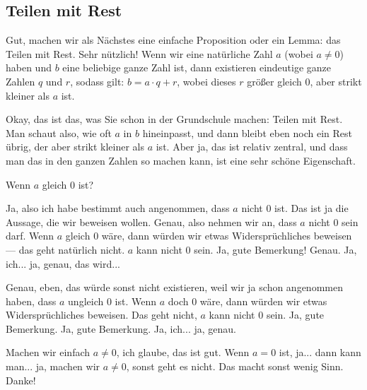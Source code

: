 \subsection{Teilen mit Rest}

\begin{spoken-clean}[00:07:09 - 00:12:02]
Gut, machen wir als Nächstes eine einfache Proposition oder ein Lemma: das Teilen mit Rest. Sehr nützlich! Wenn wir eine natürliche Zahl $a$ (wobei $a \neq 0$) haben und $b$ eine beliebige ganze Zahl ist, dann existieren eindeutige ganze Zahlen $q$ und $r$, sodass gilt: $b = a \cdot q + r$, wobei dieses $r$ größer gleich $0$, aber strikt kleiner als $a$ ist.

Okay, das ist das, was Sie schon in der Grundschule machen: Teilen mit Rest. Man schaut also, wie oft $a$ in $b$ hineinpasst, und dann bleibt eben noch ein Rest übrig, der aber strikt kleiner als $a$ ist. Aber ja, das ist relativ zentral, und dass man das in den ganzen Zahlen so machen kann, ist eine sehr schöne Eigenschaft.
\end{spoken-clean}

\begin{math-stroke}
\end{math-stroke}

\begin{student-interaction}[Studentenfrage]
Wenn $a$ gleich $0$ ist?
\end{student-interaction}

\begin{spoken-clean}[00:12:02 - 00:13:37]
Ja, also ich habe bestimmt auch angenommen, dass $a$ nicht $0$ ist. Das ist ja die Aussage, die wir beweisen wollen. Genau, also nehmen wir an, dass $a$ nicht $0$ sein darf. Wenn $a$ gleich $0$ wäre, dann würden wir etwas Widersprüchliches beweisen --- das geht natürlich nicht. $a$ kann nicht $0$ sein. Ja, gute Bemerkung! Genau. Ja, ich... ja, genau, das wird...

Genau, eben, das würde sonst nicht existieren, weil wir ja schon angenommen haben, dass $a$ ungleich $0$ ist. Wenn $a$ doch $0$ wäre, dann würden wir etwas Widersprüchliches beweisen. Das geht nicht, $a$ kann nicht $0$ sein. Ja, gute Bemerkung. Ja, gute Bemerkung. Ja, ich... ja, genau.

Machen wir einfach $a \neq 0$, ich glaube, das ist gut. Wenn $a = 0$ ist, ja... dann kann man... ja, machen wir $a \neq 0$, sonst geht es nicht. Das macht sonst wenig Sinn. Danke!
\end{spoken-clean}

